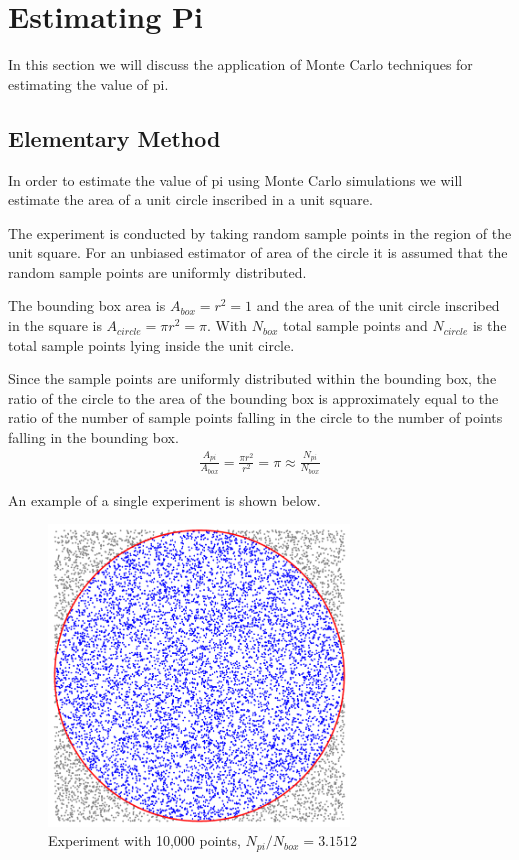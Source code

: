 \documentclass[12pt]{article}
\numberwithin{equation}{section}
\begin{document}
\section{Estimating Pi}
In this section we will discuss the application of  Monte  Carlo  techniques  for  estimating  the  value  of  pi.

\subsection{Elementary Method}
In order to estimate the value of pi using Monte Carlo simulations we will estimate the area of a unit circle inscribed in a unit square.
\par
The  experiment is  conducted by taking random sample points in the region of the unit square. For  an unbiased estimator of area of the circle it is assumed  that the  random sample  points are uniformly distributed.
\par
The bounding box area is  $A_{box}=r^2=1$ and the area of the unit circle inscribed in the square is $A_{circle}=\pi r^2=\pi$. With $N_{box}$ total sample points and $N_{circle}$ is the total sample points lying inside the unit circle.
\par
Since the sample points are uniformly distributed within the bounding box, the ratio of the circle to the area of the  bounding  box is  approximately  equal  to  the ratio  of the number  of  sample  points  falling  in  the circle to the number of points falling in the bounding box.
\begin{align}
   \frac{A_{pi}}{A_{box}}=\frac{\pi r^2}{r^2}=\pi\approx \frac{N_{pi}}{N_{box}} 
\end{align}
\par An example of a single experiment is shown below.
\begin{figure}[!htb]
    \centering
    \includegraphics[width=8cm]{Images/piexample.png}
    \caption{Experiment with 10,000 points, $N_{pi}/N_{box}=3.1512$}
    \label{fig:piexample}
\end{figure}\par
\end{document}
